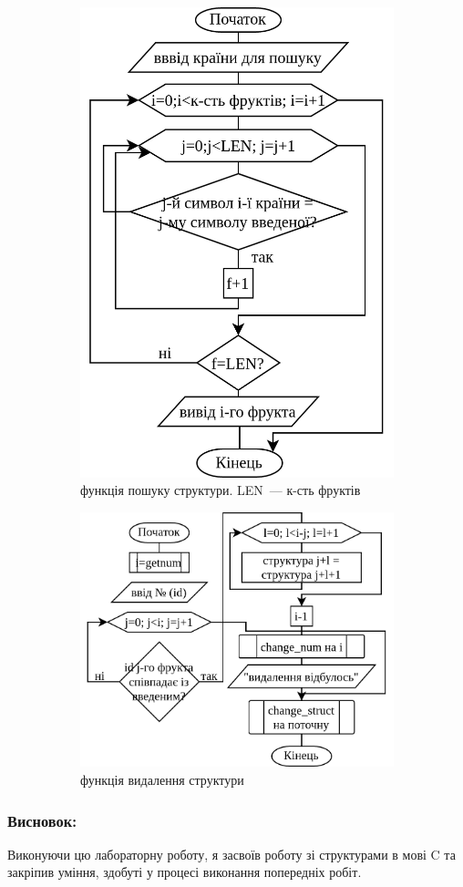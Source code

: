 \documentclass[12pt]{extreport}
\begin{document}
\begin{figure}[h]
	\begin{subfigure}[b]{.5\textwidth}
	\centering
		\includegraphics[width=.7\textwidth]{fch2/find.png}
		\caption{функція пошуку структури. LEN~--- к-сть фруктів}
	\end{subfigure}
	\hfill
	\begin{subfigure}[b]{.5\textwidth}
	\centering
		\includegraphics[width=\textwidth]{fch2/del.png}
		\caption{функція видалення структури}
	\end{subfigure}
	\caption{}
\end{figure}


\subsubsection*{Висновок:}
Виконуючи цю лабораторну роботу, я засвоїв роботу зі структурами
в мові C та закріпив уміння, здобуті у процесі виконання попередніх
робіт.
\end{document}
